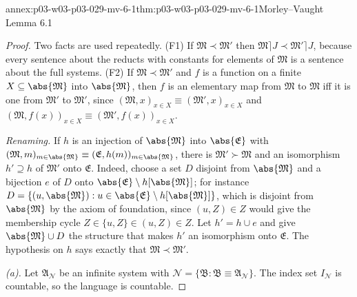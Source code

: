 \begin{annexitem}{annex:p03-w03-p03-029-mv-6-1}{thm:p03-w03-p03-029-mv-6-1}{Morley--Vaught Lemma 6.1}
\begin{proof}
Two facts are used repeatedly. (F1) If \(\mathfrak M\prec\mathfrak M'\)
then \(\mathfrak M\rceil J\prec\mathfrak M'\rceil J\), because every
sentence about the reducts with constants for elements of \(\mathfrak M\) is
a sentence about the full systems. (F2) If \(\mathfrak M\prec\mathfrak M'\)
and \(f\) is a function on a finite \(X\subseteq\abs{\mathfrak M}\) into
\(\abs{\mathfrak M}\), then \(f\) is an elementary map from \(\mathfrak M\)
to \(\mathfrak M\) iff it is one from \(\mathfrak M'\) to \(\mathfrak M'\),
since \((\mathfrak M,x)_{x\in X}\equiv(\mathfrak M',x)_{x\in X}\) and
\((\mathfrak M,f(x))_{x\in X}\equiv(\mathfrak M',f(x))_{x\in X}\).

\emph{Renaming.} If \(h\) is an injection of \(\abs{\mathfrak M}\) into
\(\abs{\mathfrak E}\) with \((\mathfrak M,m)_{m\in\abs{\mathfrak
M}}\equiv(\mathfrak E,h(m))_{m\in\abs{\mathfrak M}}\), there is
\(\mathfrak M'\succ\mathfrak M\) and an isomorphism \(h'\supseteq h\) of
\(\mathfrak M'\) onto \(\mathfrak E\). Indeed, choose a set \(D\) disjoint
from \(\abs{\mathfrak M}\) and a bijection \(e\) of \(D\) onto
\(\abs{\mathfrak E}\setminus h[\abs{\mathfrak M}]\); for instance
\(D=\{(u,\abs{\mathfrak M}):u\in\abs{\mathfrak E}\setminus
h[\abs{\mathfrak M}]\}\), which is disjoint from \(\abs{\mathfrak M}\) by
the axiom of foundation, since \((u,Z)\in Z\) would give the membership cycle
\(Z\in\{u,Z\}\in(u,Z)\in Z\). Let \(h'=h\cup e\) and give
\(\abs{\mathfrak M}\cup D\) the structure that makes \(h'\) an isomorphism
onto \(\mathfrak E\). The hypothesis on \(h\) says exactly that
\(\mathfrak M\prec\mathfrak M'\).

\emph{(a).} Let \(\mathfrak A_{\mathscr N}\) be an infinite system with
\(\mathscr N=\{\mathfrak B:\mathfrak B\equiv\mathfrak A_{\mathscr N}\}\).
The index set \(I_{\mathscr N}\) is countable, so the language is countable.


\end{proof}
\end{annexitem}
